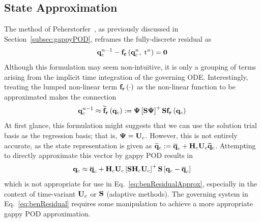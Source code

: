 \subsection{State Approximation}
%
The method of Peherstorfer~\cite{Peherstorfer2020Adaptive}, as previously discussed in Section~\ref{subsec:gappyPOD}, reframes the fully-discrete residual as
%
\begin{equation}\label{eq:benResidualTwo}
	\mathbf{q}_{c}^{n-1} - \mathbf{f}_{\mathbf{r}}\left(\mathbf{q}_{c}^{n},\; \text{t}^{n}\right) = \mathbf{0}
\end{equation}
%
Although this formulation may seem non-intuitive, it is only a grouping of terms arising from the implicit time integration of the governing ODE. Interestingly, treating the lumped non-linear term $\mathbf{f}_{\mathbf{r}}\left(\cdot\right)$ as the non-linear function to be approximated makes the connection
%
\begin{equation}\label{eq:benResidualApprox}
	\consVec^{\timeIdx-1} \approx \rhsResApproxFunc{\consVec} \defEq \deimBasis \left[\sampMat \deimBasis \right]^+ \sampMat \rhsResFunc{\consVec}
\end{equation}
%
At first glance, this formulation might suggests that we can use the solution trial basis as the regression basis; that is, $\deimBasis = \consTrial$. However, this is not entirely accurate, as the state representation is given as $\consVecRom \defEq \consVecCent + \consScale \consTrial \consVecCoef$. Attempting to directly approximate this vector by gappy POD results in
%
\begin{equation}\label{eq:stateGPODWrong}
	\consVec \approx \consVecCent + \consScale \consTrial \left[\sampMat \consScale \consTrial\right]^+ \sampMat \left[\consVec - \consVecCent\right]
\end{equation}
%
which is not appropriate for use in Eq.~\ref{eq:benResidualApprox}, especially in the context of time-variant $\consTrial$ or $\mathbf{S}$ (adaptive methods). The governing system in Eq.~\ref{eq:benResidual} requires some manipulation to achieve a more appropriate gappy POD approximation.

